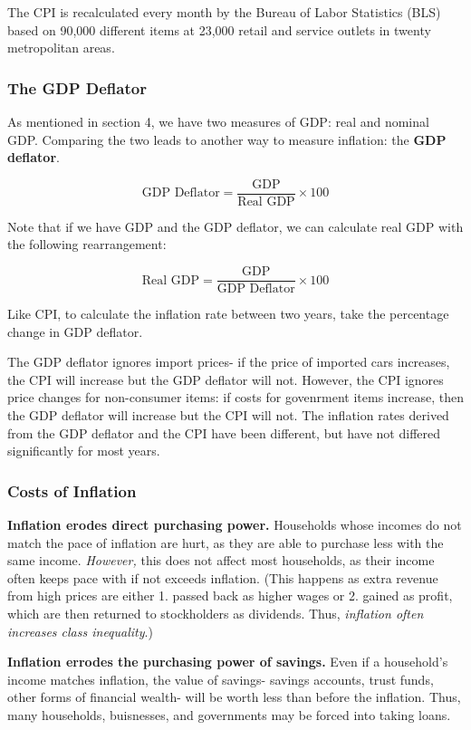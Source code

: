 \documentclass[12pt, a4paper]{article}
\theoremstyle{definition}
\begin{document}
The CPI is recalculated every month by the Bureau of Labor Statistics (BLS) based on 90,000 different items at 23,000 retail and service outlets in twenty metropolitan areas.
\subsubsection{The GDP Deflator}
As mentioned in section 4, we have two measures of GDP: real and nominal GDP.
Comparing the two leads to another way to measure inflation: the \textbf{GDP deflator}.

\[\textrm{GDP Deflator} = \frac{\textrm{GDP}}{\textrm{Real GDP}} \times 100\]

Note that if we have GDP and the GDP deflator, we can calculate real GDP with the following rearrangement:

\[\textrm{Real GDP} = \frac{\textrm{GDP}}{\textrm{GDP Deflator}} \times 100\]

Like CPI, to calculate the inflation rate between two years, take the percentage change in GDP deflator.

The GDP deflator ignores import prices- if the price of imported cars increases, the CPI will increase but the GDP deflator will not.
However, the CPI ignores price changes for non-consumer items: if costs for govenrment items increase, then the GDP deflator will increase but the CPI will not.
The inflation rates derived from the GDP deflator and the CPI have been different, but have not differed significantly for most years.

\subsubsection{Costs of Inflation}

\qquad \textbf{Inflation erodes direct purchasing power.}
Households whose incomes do not match the pace of inflation are hurt, as they are able to purchase less with the same income.
\textit{However,} this does not affect most households, as their income often keeps pace with if not exceeds inflation.
(This happens as extra revenue from high prices are either 1. passed back as higher wages or 2. gained as profit, which are then returned to stockholders as dividends.
Thus, \textit{inflation often increases class inequality}.)

\textbf{Inflation errodes the purchasing power of savings.}
Even if a household's income matches inflation, the value of savings- savings accounts, trust funds, other forms of financial wealth- will be worth less than before the inflation.
Thus, many households, buisnesses, and governments may be forced into taking loans.
\end{document}
